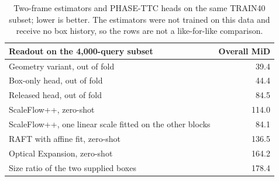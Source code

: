 \begin{table}[htbp]
\centering\small
\begin{tabular}{lr}
\toprule
Readout on the 4,000-query subset & Overall MiD \\
\midrule
Geometry variant, out of fold & 39.4 \\
Box-only head, out of fold & 44.4 \\
Released head, out of fold & 84.5 \\
ScaleFlow++, zero-shot & 114.0 \\
ScaleFlow++, one linear scale fitted on the other blocks & 84.1 \\
RAFT with affine fit, zero-shot & 136.5 \\
Optical Expansion, zero-shot & 164.2 \\
Size ratio of the two supplied boxes & 178.4 \\
\bottomrule
\end{tabular}
\caption{Two-frame estimators and PHASE-TTC heads on the same TRAIN40 subset; lower is better. The estimators were not trained on this data and receive no box history, so the rows are not a like-for-like comparison.}
\label{tab:followup-literature}
\end{table}
